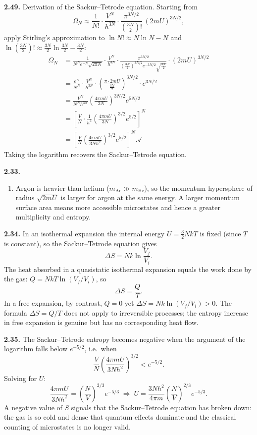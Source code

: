 
\textbf{2.49.} Derivation of the Sackur--Tetrode equation. Starting from
\[
  \Omega_N \approx \frac{1}{N!}\cdot\frac{V^N}{h^{3N}}\cdot
    \frac{\pi^{3N/2}}{\left(\tfrac{3N}{2}\right)!}\,(2mU)^{3N/2},
\]
apply Stirling's approximation to $\ln N! \approx N\ln N - N$ and
$\ln\!\left(\tfrac{3N}{2}\right)! \approx \tfrac{3N}{2}\ln\tfrac{3N}{2} - \tfrac{3N}{2}$:
\begin{align*}
  \Omega_N
  &= \frac{1}{N^N e^{-N}\!\sqrt{2\pi N}}\cdot\frac{V^N}{h^{3N}}
     \cdot\frac{\pi^{3N/2}}{\!\left(\tfrac{3N}{2}\right)^{3N/2}\!e^{-3N/2}\!\sqrt{\tfrac{3N}{2}}}
     \cdot(2mU)^{3N/2} \\[4pt]
  &= \frac{e^N}{N^N}\cdot\frac{V^N}{h^{3N}}
     \cdot\left(\frac{\pi\cdot 2mU}{\tfrac{3N}{2}}\right)^{3N/2}\cdot e^{3N/2} \\[4pt]
  &= \frac{V^N}{N^N h^{3N}}\left(\frac{4\pi mU}{3N}\right)^{3N/2} e^{5N/2} \\[4pt]
  &= \left[\frac{V}{N}\cdot\frac{1}{h^3}\left(\frac{4\pi mU}{3N}\right)^{3/2} e^{5/2}\right]^N \\[4pt]
  &= \left[\frac{V}{N}\left(\frac{4\pi mU}{3Nh^2}\right)^{3/2} e^{5/2}\right]^N. \checkmark
\end{align*}
Taking the logarithm recovers the Sackur--Tetrode equation.

\textbf{2.33.}
\begin{enumerate}
  \item[a)] Argon is heavier than helium ($m_{\text{Ar}} \gg m_{\text{He}}$), so the momentum
  hypersphere of radius $\sqrt{2mU}$ is larger for argon at the same energy. A larger momentum
  surface area means more accessible microstates and hence a greater multiplicity and entropy.
\end{enumerate}

\textbf{2.34.} In an isothermal expansion the internal energy $U = \tfrac{3}{2}NkT$ is fixed
(since $T$ is constant), so the Sackur--Tetrode equation gives
\[
  \Delta S = Nk\ln\frac{V_f}{V_i}.
\]
The heat absorbed in a quasistatic isothermal expansion equals the work done by the gas:
$Q = NkT\ln(V_f/V_i)$, so
\[
  \Delta S = \frac{Q}{T}.
\]
In a free expansion, by contrast, $Q = 0$ yet $\Delta S = Nk\ln(V_f/V_i) > 0$. The formula
$\Delta S = Q/T$ does not apply to irreversible processes; the entropy increase in free expansion
is genuine but has no corresponding heat flow.

\textbf{2.35.} The Sackur--Tetrode entropy becomes negative when the argument of the logarithm
falls below $e^{-5/2}$, i.e.\ when
\[
  \frac{V}{N}\left(\frac{4\pi mU}{3Nh^2}\right)^{3/2} < e^{-5/2}.
\]
Solving for $U$:
\[
  \frac{4\pi mU}{3Nh^2} = \left(\frac{N}{V}\right)^{2/3} e^{-5/3}
  \;\Longrightarrow\;
  U = \frac{3Nh^2}{4\pi m}\left(\frac{N}{V}\right)^{2/3} e^{-5/3}.
\]
A negative value of $S$ signals that the Sackur--Tetrode equation has broken down: the gas is
so cold and dense that quantum effects dominate and the classical counting of microstates is no
longer valid.

